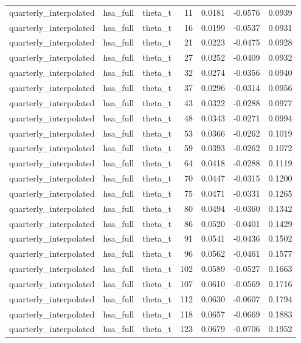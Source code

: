 \begin{tabular}{lllrrrr}
quarterly\_interpolated & hsa\_full & theta\_t & 11 & 0.0181 & -0.0576 & 0.0939 \\
quarterly\_interpolated & hsa\_full & theta\_t & 16 & 0.0199 & -0.0537 & 0.0931 \\
quarterly\_interpolated & hsa\_full & theta\_t & 21 & 0.0223 & -0.0475 & 0.0928 \\
quarterly\_interpolated & hsa\_full & theta\_t & 27 & 0.0252 & -0.0409 & 0.0932 \\
quarterly\_interpolated & hsa\_full & theta\_t & 32 & 0.0274 & -0.0356 & 0.0940 \\
quarterly\_interpolated & hsa\_full & theta\_t & 37 & 0.0296 & -0.0314 & 0.0956 \\
quarterly\_interpolated & hsa\_full & theta\_t & 43 & 0.0322 & -0.0288 & 0.0977 \\
quarterly\_interpolated & hsa\_full & theta\_t & 48 & 0.0343 & -0.0271 & 0.0994 \\
quarterly\_interpolated & hsa\_full & theta\_t & 53 & 0.0366 & -0.0262 & 0.1019 \\
quarterly\_interpolated & hsa\_full & theta\_t & 59 & 0.0393 & -0.0262 & 0.1072 \\
quarterly\_interpolated & hsa\_full & theta\_t & 64 & 0.0418 & -0.0288 & 0.1119 \\
quarterly\_interpolated & hsa\_full & theta\_t & 70 & 0.0447 & -0.0315 & 0.1200 \\
quarterly\_interpolated & hsa\_full & theta\_t & 75 & 0.0471 & -0.0331 & 0.1265 \\
quarterly\_interpolated & hsa\_full & theta\_t & 80 & 0.0494 & -0.0360 & 0.1342 \\
quarterly\_interpolated & hsa\_full & theta\_t & 86 & 0.0520 & -0.0401 & 0.1429 \\
quarterly\_interpolated & hsa\_full & theta\_t & 91 & 0.0541 & -0.0436 & 0.1502 \\
quarterly\_interpolated & hsa\_full & theta\_t & 96 & 0.0562 & -0.0461 & 0.1577 \\
quarterly\_interpolated & hsa\_full & theta\_t & 102 & 0.0589 & -0.0527 & 0.1663 \\
quarterly\_interpolated & hsa\_full & theta\_t & 107 & 0.0610 & -0.0569 & 0.1716 \\
quarterly\_interpolated & hsa\_full & theta\_t & 112 & 0.0630 & -0.0607 & 0.1794 \\
quarterly\_interpolated & hsa\_full & theta\_t & 118 & 0.0657 & -0.0669 & 0.1883 \\
quarterly\_interpolated & hsa\_full & theta\_t & 123 & 0.0679 & -0.0706 & 0.1952 \\

\end{tabular}
